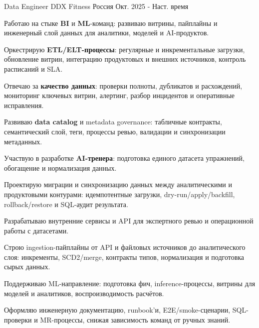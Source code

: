 

\begin{cventries}

  \cventry
    {Data Engineer} %
    {DDX Fitness} %
    {Россия} %
    {Окт. 2025 - Наст. время} %
    {
      \begin{cvitems}
        \item {Работаю на стыке \textbf{BI} и \textbf{ML}-команд: развиваю витрины, пайплайны и инженерный слой данных для аналитики, моделей и AI-продуктов.}
        \item {Оркестрирую \textbf{ETL/ELT-процессы}: регулярные и инкрементальные загрузки, обновление витрин, интеграцию продуктовых и внешних источников, контроль расписаний и SLA.}
        \item {Отвечаю за \textbf{качество данных}: проверки полноты, дубликатов и расхождений, мониторинг ключевых витрин, алертинг, разбор инцидентов и оперативные исправления.}
        \item {Развиваю \textbf{data catalog} и metadata governance: табличные контракты, семантический слой, теги, процессы ревью, валидации и синхронизации метаданных.}
        \item {Участвую в разработке \textbf{AI-тренера}: подготовка единого датасета упражнений, обогащение и нормализация данных.}
        \item {Проектирую миграции и синхронизацию данных между аналитическими и продуктовыми контурами: идемпотентные загрузки, dry-run/apply/backfill, rollback/restore и SQL-аудит результата.}
        \item {Разрабатываю внутренние сервисы и API для экспертного ревью и операционной работы с датасетами.}
        \item {Строю ingestion-пайплайны от API и файловых источников до аналитического слоя: инкременты, SCD2/merge, контракты типов, нормализация и подготовка сырых данных.}
        \item {Поддерживаю ML-направление: подготовка фич, inference-процессы, витрины для моделей и аналитиков, воспроизводимость расчётов.}
        \item {Оформляю инженерную документацию, runbook'и, E2E/smoke-сценарии, SQL-проверки и MR-процессы, снижая зависимость команд от ручных знаний.}
      \end{cvitems}
    }



\end{cventries}
